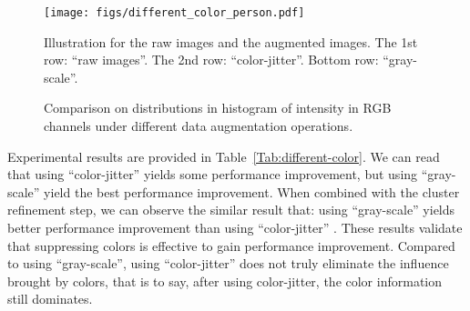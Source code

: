 \documentclass[journal]{IEEEtran}
\begin{document}
\begin{figure}
\begin{center}
\texttt{[image: figs/different\_color\_person.pdf]} \end{center}
  \caption{ Illustration for the raw images and the augmented images.  The 1st row: ``raw images''. The 2nd row: ``color-jitter''. Bottom row: ``gray-scale''. }
  
\label{fig:color}
\end{figure}



\begin{figure*}[!ht]
\begin{center}
\footnotesize
{}  



\end{center}
\caption{{  Comparison on distributions in histogram of intensity in RGB channels
under different data augmentation operations.}}
\label{fig:color_his}
\end{figure*}


Experimental results are provided in Table~\ref{Tab:different-color}.  We can read that
using ``color-jitter''  yields some performance improvement, but using ``gray-scale''  yield the best performance improvement.  
When combined with the cluster refinement step, we can observe the similar result that: using ``gray-scale''  yields better performance improvement than using ``color-jitter'' . 
These results validate that suppressing colors is effective to gain performance improvement. Compared to using ``gray-scale'', using ``color-jitter'' does not truly eliminate the influence brought by colors, that is to say, after using color-jitter, the color information still dominates. 
\end{document}

